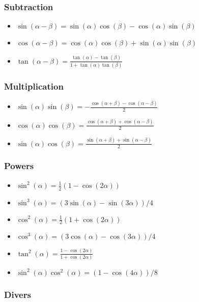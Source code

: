 \documentclass[a4paper,fontsize = 10pt]{article}
\begin{document}
\subsubsection*{Subtraction}
\begin{itemize}
 \item $\sin(\alpha - \beta) = \sin(\alpha) \cos(\beta) - \cos(\alpha)\sin(\beta)$
 \item $\cos(\alpha - \beta) = \cos(\alpha) \cos(\beta) + \sin(\alpha)\sin(\beta)$
 \item $\tan(\alpha - \beta) = \frac{\tan(\alpha) - \tan(\beta)}{1+\tan(\alpha) \tan(\beta)}$
\end{itemize}

\subsubsection*{Multiplication}
\begin{itemize}
 \item $\sin(\alpha) \sin(\beta) = -\frac{\cos(\alpha + \beta) - \cos(\alpha - \beta)}{2}$
 \item $\cos(\alpha) \cos(\beta) =  \frac{\cos(\alpha + \beta) + \cos(\alpha - \beta)}{2}$
 \item $\sin(\alpha) \cos(\beta) =  \frac{\sin(\alpha + \beta) + \sin(\alpha - \beta)}{2}$
\end{itemize}

\subsubsection*{Powers}
\begin{itemize}
 \item $\sin^2(\alpha) = \frac{1}{2}(1-\cos(2\alpha))$
 \item $\sin^3(\alpha) = (3 \sin(\alpha) - \sin(3\alpha))/4$
 \item $\cos^2(\alpha) = \frac{1}{2}(1+\cos(2\alpha))$
 \item $\cos^3(\alpha) = (3 \cos(\alpha) - \cos(3\alpha))/4$
 \item $\tan^2(\alpha) = \frac{1-\cos(2\alpha)}{1+\cos(2\alpha)}$
 \item $\sin^2(\alpha)\cos^2(\alpha) = (1 - \cos(4\alpha))/8$
\end{itemize}

\subsubsection*{Divers}
\end{document}
